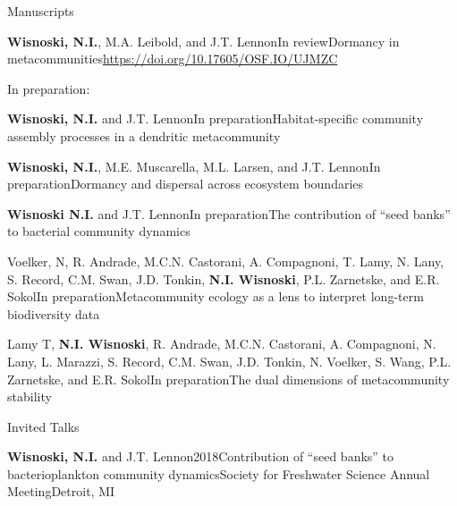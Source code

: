 \documentclass{resume} %
\begin{document}
\bigskip
\newpage

\begin{rhangSection}{Manuscripts}

\begin{Prep}{{\bf Wisnoski, N.I.}, M.A. Leibold, and J.T. Lennon}{In review}{Dormancy in metacommunities}{\url{https://doi.org/10.17605/OSF.IO/UJMZC}}
\end{Prep}

\smallskip
{ In preparation:}

\begin{Prep}{{\bf Wisnoski, N.I.} and J.T. Lennon}{In preparation}{Habitat-specific community assembly processes in a dendritic metacommunity}{}
\end{Prep}

\begin{Prep}{{\bf Wisnoski, N.I.}, M.E. Muscarella, M.L. Larsen, and J.T. Lennon}{In preparation}{Dormancy and dispersal across ecosystem boundaries}{}
\end{Prep}

\begin{Prep}{{\bf Wisnoski N.I.} and J.T. Lennon}{In preparation}{The contribution of \enquote{seed banks} to bacterial community dynamics}{}
\end{Prep}

\begin{Prep}{Voelker, N, R. Andrade, M.C.N. Castorani, A. Compagnoni, T. Lamy, N. Lany, S. Record, C.M. Swan, J.D. Tonkin, {\bf N.I. Wisnoski}, P.L. Zarnetske, and E.R. Sokol}{In preparation}{Metacommunity ecology as a lens to interpret long-term biodiversity data}{}
\end{Prep}

\begin{Prep}{Lamy T, {\bf N.I. Wisnoski}, R. Andrade, M.C.N. Castorani, A. Compagnoni, N. Lany, L. Marazzi, S. Record, C.M. Swan, J.D. Tonkin, N. Voelker, S. Wang, P.L. Zarnetske, and E.R. Sokol}{In preparation}{The dual dimensions of metacommunity stability}{}
\end{Prep}

\end{rhangSection}

\bigskip
\begin{rhangSection}{Invited Talks}

  \begin{Presentation}{{\bf Wisnoski, N.I.} and J.T. Lennon}{2018}{Contribution of \enquote{seed banks} to bacterioplankton community dynamics}{Society for Freshwater Science Annual Meeting}{Detroit, MI}
  \end{Presentation}

\end{rhangSection}
\end{document}
